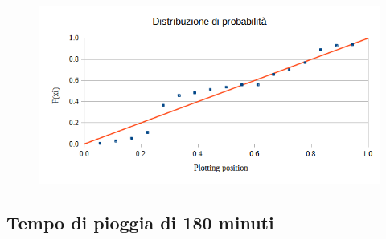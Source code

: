 \begin{figure}[H]\centering
    \includegraphics[scale=0.75]{immagini/distr_prob_120.png}
\end{figure}

\subsection{Tempo di pioggia di 180 minuti}

